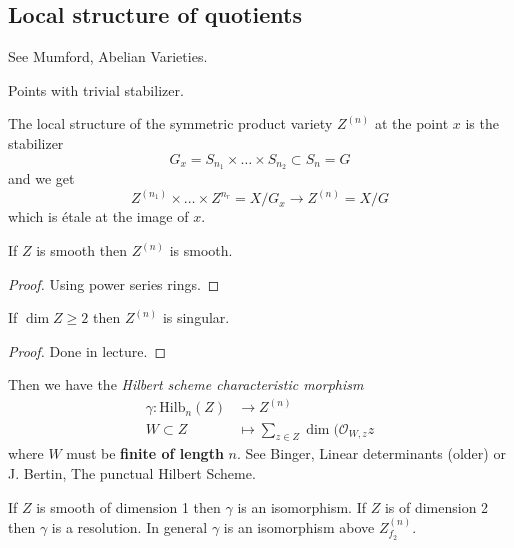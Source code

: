 \subsection*{Local structure of quotients}
\label{subsection-local-structure-of-quotients}

See Mumford, Abelian Varieties.

\begin{definition}
\label{definition-free-locus}
Points with trivial stabilizer.
\end{definition}

The local structure of  the symmetric product variety $Z^{(n)}$ 
at the point $x$ is the stabilizer
$$
G_x=S_{n_1}\times\ldots\times S_{n_2}\subset S_n=G
$$
and we get
$$
Z^{(n_1)}\times\ldots\times Z^{n_r} = X/G_x \to Z^{(n)}=X/G
$$
which is étale at the image of $x$.

\begin{proposition}
\label{proposition-variety-smooth-then-symmetric-product-smooth}
If $Z$ is smooth then $Z^{(n)}$ is smooth.
\end{proposition}

\begin{proof}
Using power series rings.
\end{proof}

\begin{proposition}
\label{proposition-simension-geq2-then-symmetric-product-singular}
If $\dim Z \geq 2$ then $Z^{(n)}$ is singular.
\end{proposition}

\begin{proof}
Done in lecture.
\end{proof}

\medskip\noindent
Then we have the {\it Hilbert scheme characteristic morphism}
\begin{align*}
\gamma: \text{Hilb}_n(Z) &\longrightarrow Z^{(n)} \\
W\subset Z &\longmapsto \sum_{z \in Z}\dim (\mathcal{O}_{W,z}z
\end{align*}
where $W$ must be {\bf finite of length }$n$. See Binger, Linear determinants
(older) or J. Bertin, The punctual Hilbert Scheme.

If $Z$ is smooth of dimension 1 then $\gamma$ is an isomorphism. If $Z$ is of
dimension 2 then $\gamma$ is a resolution. In general $\gamma$ is an isomorphism
above $Z_{f_2}^{(n)}$.

